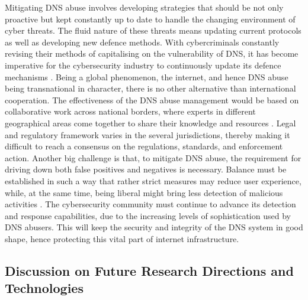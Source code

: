 Mitigating DNS abuse involves developing strategies that should be not only proactive but kept constantly up to date to handle the changing environment of cyber threats. The fluid nature of these threats means updating current protocols as well as developing new defence methods. With cybercriminals constantly revising their methods of capitalising on the vulnerability of DNS, it has become imperative for the cybersecurity industry to continuously update its defence mechanisms \cite{bhattacharya2023dns}. Being a global phenomenon, the internet, and hence DNS abuse being transnational in character, there is no other alternative than international cooperation. The effectiveness of the DNS abuse management would be based on collaborative work across national borders, where experts in different geographical areas come together to share their knowledge and resources \cite{altulaihan2022cybersecurity}. Legal and regulatory framework varies in the several jurisdictions, thereby making it difficult to reach a consensus on the regulations, standards, and enforcement action. Another big challenge is that, to mitigate DNS abuse, the requirement for driving down both false positives and negatives is necessary. Balance must be established in such a way that rather strict measures may reduce user experience, while, at the same time, being liberal might bring less detection of malicious activities \cite{lyu2022survey}. The cybersecurity community must continue to advance its detection and response capabilities, due to the increasing levels of sophistication used by DNS abusers. This will keep the security and integrity of the DNS system in good shape, hence protecting this vital part of internet infrastructure.

\subsection{Discussion on Future Research Directions and Technologies}

